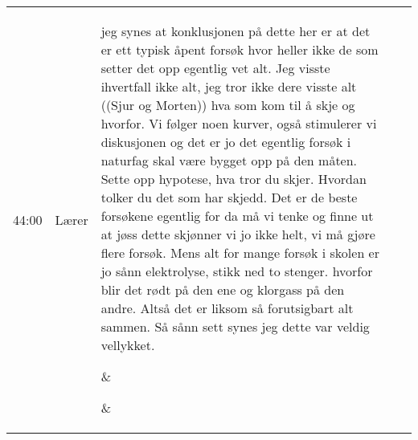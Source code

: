 \begin{center}
\begin{longtable}{r p{1.5cm} p{5cm} p{4cm} p{3cm} }
44:00 %
&Lærer %
&\parbox[t]{5cm}{\raggedright jeg synes at konklusjonen på dette her er at det er ett typisk åpent forsøk hvor heller ikke de som setter det opp egentlig vet alt. Jeg visste ihvertfall ikke alt, jeg tror ikke dere visste alt ((Sjur og Morten)) hva som kom til å skje og hvorfor. Vi følger noen kurver, også stimulerer vi diskusjonen og det er jo det egentlig forsøk i naturfag skal være bygget opp på den måten. Sette opp hypotese, hva tror du skjer. Hvordan tolker du det som har skjedd. Det er de beste forsøkene egentlig for da må vi tenke og finne ut at jøss dette skjønner vi jo ikke helt, vi må gjøre flere forsøk. Mens alt for mange forsøk i skolen er jo sånn elektrolyse, stikk ned to stenger. hvorfor blir det rødt på den ene og klorgass på den andre. Altså det er liksom så forutsigbart alt sammen. Så sånn sett synes jeg dette var veldig vellykket.  %
}&\parbox[t]{4cm}{\raggedright  %
}&\parbox[t]{3cm}{\raggedright%
}\\

\end{longtable}
\end{center}
